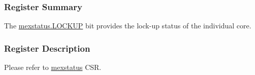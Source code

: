 \documentclass[main\_\_EN.tex]{subfiles}
\begin{document}
\subsubsection{Register Summary}
\label{sec:riscvcpu-custom-lockup-reg-summ}

The \hyperref[fielddesc:MEXSTATUS_LOCKUP]{mexstatus.LOCKUP} bit provides the lock-up status of the individual core.

\subsubsection{Register Description}
\label{sec:riscvcpu-custom-lockup-reg-desc}
Please refer to \hyperref[regdesc:MEXSTATUS]{mexstatus} CSR.
\end{document}

